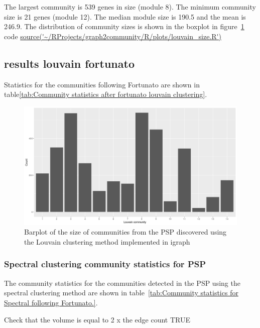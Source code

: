 The largest community is 539 genes in size (module 8). The minimum community size is 21 genes (module 12). The median module size is 190.5 and the mean is 246.9. The distribution of community sizes is shown in the boxplot in figure~\ref{fig:barplot_size_commmunities_using_louvain} code \url{source('~/RProjects/graph2community/R/plots/louvain_size.R')}
\subsection{results louvain fortunato}
Statistics for the communities following Fortunato \cite{fortunato2016community} are shown in table\ref{tab:Community statistics after fortunato louvain clustering}.

\begin{figure}
    \centering
    \includegraphics[width=\textwidth]{images/Rplot_Louvain_community_sizes.png}
    \caption{Barplot of the size of communities from the PSP discovered using the Louvain clustering method implemented in igraph}
    \label{fig:barplot_size_commmunities_using_louvain}
\end{figure}





\subsubsection{Spectral clustering community statistics for PSP}

The community statistics for the communities detected in the PSP using the spectral clustering method are shown in table~\ref{tab:Community statistics for Spectral following Fortunato.}.

Check that the volume is equal to 2 x the edge count  TRUE 


